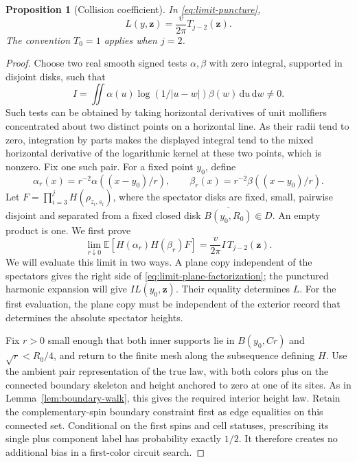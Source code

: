 \documentclass[11pt]{article}
\newcommand{\E}{\mathbb E}
\newcommand{\dd}{\,\mathrm d}
\newtheorem{proposition}[theorem]{Proposition}
\theoremstyle{definition}
\theoremstyle{remark}
\numberwithin{equation}{section}
\begin{document}
\begin{proposition}[Collision coefficient]
\label{prop:collision}
In \eqref{eq:limit-puncture},
\begin{equation}
              L(y,\mathbf z)=\frac{v}{2\pi}T_{j-2}(\mathbf z).
 \label{eq:limit-collision}
\end{equation}
The convention \(T_0=1\) applies when \(j=2\).
\end{proposition}

\begin{proof}
Choose two real smooth signed tests \(\alpha,\beta\) with zero
integral, supported in disjoint disks, such that
\[
 I=\iint\alpha(u)\log(1/|u-w|)\beta(w)\dd u\dd w\ne0.
\]
Such tests can be obtained by taking horizontal derivatives of
unit mollifiers concentrated about two distinct points on a
horizontal line.  As their radii tend to zero, integration by parts
makes the displayed integral tend to the mixed horizontal derivative
of the logarithmic kernel at these two points, which is nonzero.
Fix one such pair.  For a fixed point \(y_0\), define
\[
 \alpha_r(x)=r^{-2}\alpha((x-y_0)/r),\qquad
 \beta_r(x)=r^{-2}\beta((x-y_0)/r).
\]
Let \(F=\prod_{i=3}^jH(\rho_{z_i,s_i})\), where the spectator disks
are fixed, small, pairwise disjoint and separated from a fixed
closed disk \(\overline{B(y_0,R_0)}\Subset D\).
An empty product is one.  We first prove
\begin{equation}
 \lim_{r\downarrow0}
       \E[H(\alpha_r)H(\beta_r)F]
          =\frac{v}{2\pi}I\,T_{j-2}(\mathbf z).
 \label{eq:limit-plane-factorization}
\end{equation}
We will evaluate this limit in two ways.  A plane copy independent of
the spectators gives the right side of
\eqref{eq:limit-plane-factorization}; the punctured harmonic expansion
will give \(I L(y_0,\mathbf z)\).  Their equality determines \(L\).
For the first evaluation, the plane copy must be independent of the
exterior record that determines the absolute spectator heights.

Fix \(r>0\) small enough that both inner supports lie in
\(B(y_0,Cr)\) and \(\sqrt r<R_0/4\), and return to the finite
mesh along the subsequence defining \(H\).
Use the ambient pair representation of the true law, with both
colors plus on the connected boundary skeleton and height anchored
to zero at one of its sites.  As in Lemma~\ref{lem:boundary-walk},
this gives the required interior height law.
Retain the complementary-spin boundary constraint first as edge
equalities on this connected set.  Conditional on the first spins
and cell statuses, prescribing its single plus component label has
probability exactly \(1/2\).  It therefore creates no additional
bias in a first-color circuit search.


\end{proof}
\end{document}

